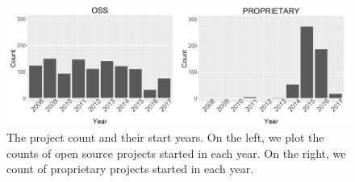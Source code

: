 \begin{figure}[t!]
	\centering
	\includegraphics[width=\linewidth]{images/start_date.png}
	\caption{The project count and their start years. On the left, we plot the counts of open source projects started in each year. On the right, we count of proprietary projects started in each year.}
	\label{fig:start_date}
\end{figure}
